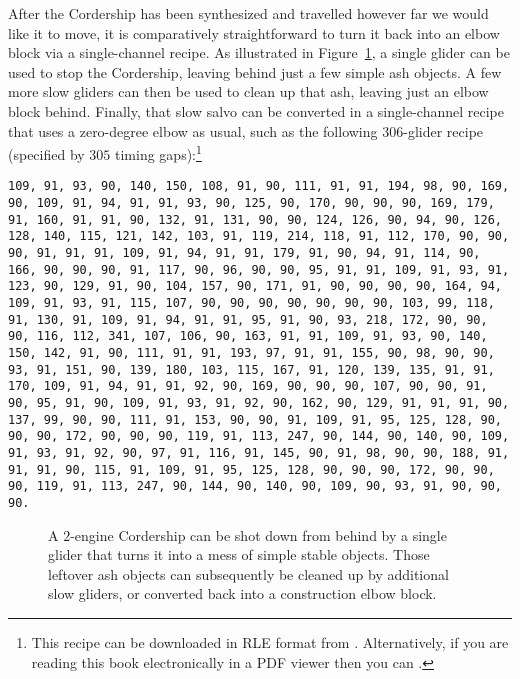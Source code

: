 After the Cordership has been synthesized and travelled however far we would like it to move, it is comparatively straightforward to turn it back into an elbow block via a single-channel recipe. As illustrated in Figure~\ref{fig:cordership_shoot_down}, a single glider can be used to stop the Cordership, leaving behind just a few simple ash objects. A few more slow gliders can then be used to clean up that ash, leaving just an elbow block behind. Finally, that slow salvo can be converted in a single-channel recipe that uses a zero-degree elbow as usual, such as the following $306$-glider recipe (specified by $305$ timing gaps):\footnote{This recipe can be downloaded in RLE format from . Alternatively, if you are reading this book electronically in a PDF viewer then you can .}\\[-0.1cm]

\begin{sloppypar}
	\noindent\texttt{\footnotesize 109, 91, 93, 90, 140, 150, 108, 91, 90, 111, 91, 91, 194, 98, 90, 169, 90, 109, 91, 94, 91, 91, 93, 90, 125, 90, 170, 90, 90, 90, 169, 179, 91, 160, 91, 91, 90, 132, 91, 131, 90, 90, 124, 126, 90, 94, 90, 126, 128, 140, 115, 121, 142, 103, 91, 119, 214, 118, 91, 112, 170, 90, 90, 90, 91, 91, 91, 109, 91, 94, 91, 91, 179, 91, 90, 94, 91, 114, 90, 166, 90, 90, 90, 91, 117, 90, 96, 90, 90, 95, 91, 91, 109, 91, 93, 91, 123, 90, 129, 91, 90, 104, 157, 90, 171, 91, 90, 90, 90, 90, 164, 94, 109, 91, 93, 91, 115, 107, 90, 90, 90, 90, 90, 90, 90, 103, 99, 118, 91, 130, 91, 109, 91, 94, 91, 91, 95, 91, 90, 93, 218, 172, 90, 90, 90, 116, 112, 341, 107, 106, 90, 163, 91, 91, 109, 91, 93, 90, 140, 150, 142, 91, 90, 111, 91, 91, 193, 97, 91, 91, 155, 90, 98, 90, 90, 93, 91, 151, 90, 139, 180, 103, 115, 167, 91, 120, 139, 135, 91, 91, 170, 109, 91, 94, 91, 91, 92, 90, 169, 90, 90, 90, 107, 90, 90, 91, 90, 95, 91, 90, 109, 91, 93, 91, 92, 90, 162, 90, 129, 91, 91, 91, 90, 137, 99, 90, 90, 111, 91, 153, 90, 90, 91, 109, 91, 95, 125, 128, 90, 90, 90, 172, 90, 90, 90, 119, 91, 113, 247, 90, 144, 90, 140, 90, 109, 91, 93, 91, 92, 90, 97, 91, 116, 91, 145, 90, 91, 98, 90, 90, 188, 91, 91, 91, 90, 115, 91, 109, 91, 95, 125, 128, 90, 90, 90, 172, 90, 90, 90, 119, 91, 113, 247, 90, 144, 90, 140, 90, 109, 90, 93, 91, 90, 90, 90.}
\end{sloppypar}

\begin{figure}[!htb]
	\centering
	
	\caption{A $2$-engine Cordership can be shot down from behind by a single glider that turns it into a mess of simple stable objects. Those leftover ash objects can subsequently be cleaned up by additional slow gliders, or converted back into a construction elbow block.}\label{fig:cordership_shoot_down}
\end{figure}

